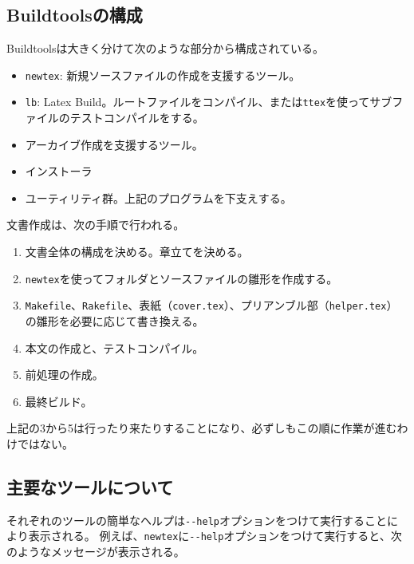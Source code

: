 \hypertarget{buildtoolsux306eux69cbux6210}{%
\subsection{Buildtoolsの構成}\label{buildtoolsux306eux69cbux6210}}

Buildtoolsは大きく分けて次のような部分から構成されている。

\begin{itemize}
\tightlist
\item
  \texttt{newtex}: 新規ソースファイルの作成を支援するツール。
\item
  \texttt{lb}: Latex
  Build。ルートファイルをコンパイル、または\texttt{ttex}を使ってサブファイルのテストコンパイルをする。
\item
  アーカイブ作成を支援するツール。
\item
  インストーラ
\item
  ユーティリティ群。上記のプログラムを下支えする。
\end{itemize}

文書作成は、次の手順で行われる。

\begin{enumerate}
\def\labelenumi{\arabic{enumi}.}
\tightlist
\item
  文書全体の構成を決める。章立てを決める。
\item
  \texttt{newtex}を使ってフォルダとソースファイルの雛形を作成する。
\item
  \texttt{Makefile}、\texttt{Rakefile}、表紙（\texttt{cover.tex}）、プリアンブル部（\texttt{helper.tex}）の雛形を必要に応じて書き換える。
\item
  本文の作成と、テストコンパイル。
\item
  前処理の作成。
\item
  最終ビルド。
\end{enumerate}

上記の3から5は行ったり来たりすることになり、必ずしもこの順に作業が進むわけではない。

\hypertarget{ux4e3bux8981ux306aux30c4ux30fcux30ebux306bux3064ux3044ux3066}{%
\subsection{主要なツールについて}\label{ux4e3bux8981ux306aux30c4ux30fcux30ebux306bux3064ux3044ux3066}}

それぞれのツールの簡単なヘルプは\texttt{-\/-help}オプションをつけて実行することにより表示される。
例えば、\texttt{newtex}に\texttt{-\/-help}オプションをつけて実行すると、次のようなメッセージが表示される。

